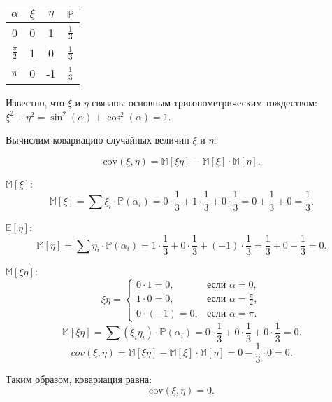\documentclass[../Main.tex]{subfiles}
\begin{document}
\begin{center}
    \begin{tabular}{|c|c|c|c|}
        \hline
        \(\alpha\) & \(\xi\) & \(\eta\) & \(\mathbb{P}\) \\ 
        \hline
        0 & 0 & 1 & \(\frac{1}{3}\) \\ 
        \hline
        \(\frac{\pi}{2}\) & 1 & 0 & \(\frac{1}{3}\) \\  
        \hline
        \(\pi\) & 0 & -1 & \(\frac{1}{3}\) \\ 
        \hline
    \end{tabular}
\end{center}

Известно, что \(\xi\) и \(\eta\) связаны основным тригонометрическим тождеством: \(\xi^2 + \eta^2 = \sin^2(\alpha) + \cos^2(\alpha) = 1\).

Вычислим ковариацию случайных величин \(\xi\) и \(\eta\):

\[
\text{cov}(\xi, \eta) = \mathbb{M}[\xi \eta] - \mathbb{M}[\xi] \cdot \mathbb{M}[\eta].
\]

\(\mathbb{M}[\xi]\):
\[
\mathbb{M}[\xi] = \sum \xi_i \cdot \mathbb{P}(\alpha_i) = 0 \cdot \frac{1}{3} + 1 \cdot \frac{1}{3} + 0 \cdot \frac{1}{3} = 0 + \frac{1}{3} + 0 = \frac{1}{3}.
\]

\(\mathbb{E}[\eta]\):
\[
\mathbb{M}[\eta] = \sum \eta_i \cdot \mathbb{P}(\alpha_i) = 1 \cdot \frac{1}{3} + 0 \cdot \frac{1}{3} + (-1) \cdot \frac{1}{3} = \frac{1}{3} + 0 - \frac{1}{3} = 0.
\]

\(\mathbb{M}[\xi \eta]\):
\[
\xi \eta =
\begin{cases} 
0 \cdot 1 = 0, & \text{если } \alpha = 0, \\
1 \cdot 0 = 0, & \text{если } \alpha = \frac{\pi}{2}, \\
0 \cdot (-1) = 0, & \text{если } \alpha = \pi.
\end{cases}
\]
\[
\mathbb{M}[\xi \eta] = \sum (\xi_i \eta_i) \cdot \mathbb{P}(\alpha_i) = 0 \cdot \frac{1}{3} + 0 \cdot \frac{1}{3} + 0 \cdot \frac{1}{3} = 0.
\]
\[
cov(\xi, \eta) = \mathbb{M}[\xi \eta] - \mathbb{M}[\xi] \cdot \mathbb{M}[\eta] = 0 - \frac{1}{3} \cdot 0 = 0.
\]

Таким образом, ковариация равна:
\[
\text{cov}(\xi, \eta) = 0.
\]

\end{document}
